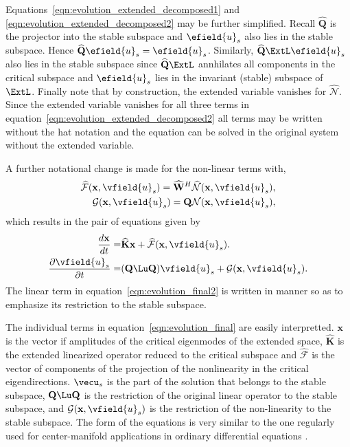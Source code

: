 Equations~\eqref{eqn:evolution_extended_decomposed1} and \eqref{eqn:evolution_extended_decomposed2} may be further simplified. Recall $\mathbf{\widehat{Q}}$ is the projector into the stable subspace and $\efield{u}_{s}$ also lies in the stable subspace. Hence $\mathbf{\widehat{Q}}\efield{u}_{s} = \efield{u}_{s}$. Similarly, $\mathbf{\widehat{Q}}\ExtL\efield{u}_{s}$ also lies in the stable subspace since $\mathbf{\widehat{Q}}\ExtL$ annhilates all components in the critical subspace and $\efield{u}_{s}$ lies in the invariant (stable) subspace of $\ExtL$. Finally note that by construction, the extended variable vanishes for $\mathcal{\widehat{N}}$. Since the extended variable vanishes for all three terms in equation~\eqref{eqn:evolution_extended_decomposed2} all terms may be written without the hat notation and the equation can be solved in the original system without the extended variable. 

A further notational change is made for the non-linear terms with,
\begin{eqnarray}
	\mathcal{\widehat{F}}(\mathbf{x},\vfield{u}_{s}) = \mathbf{\widehat{W}}^{H}\mathcal{\widehat{N}}(\mathbf{x},\vfield{u}_{s}), \nonumber \\
	\mathcal{G}(\mathbf{x},\vfield{u}_{s}) = \mathbf{Q}\mathcal{N}(\mathbf{x},\vfield{u}_{s}), \nonumber
\end{eqnarray} 
which results in the pair of equations given by
\begin{subequations}
	\begin{align}
		\dfrac{d\mathbf{x}}{d t} =& \mathbf{\widehat{K}}\mathbf{x} + \mathcal{\widehat{F}}(\mathbf{x},\vfield{u}_{s}) \label{eqn:evolution_final1}.\\
		\dfrac{\partial \vfield{u}_{s}}{\partial t} =& (\mathbf{Q}\Lu \mathbf{Q})\vfield{u}_{s} + \mathcal{G}(\mathbf{x},\vfield{u}_{s})
		\label{eqn:evolution_final2}. 
	\end{align}
	\label{eqn:evolution_final}
\end{subequations}
 The linear term in equation~\eqref{eqn:evolution_final2} is written in manner so as to emphasize its restriction to the stable subspace. 
 
 The individual terms in equation~\eqref{eqn:evolution_final} are easily interpretted. $\mathbf{x}$ is the vector if amplitudes of the critical eigenmodes of the extended space, $\mathbf{\widehat{K}}$ is the extended linearized operator reduced to the critical subspace and $\mathcal{\widehat{F}}$ is the vector of components of the projection of the nonlinearity in the critical eigendirections. $\vecu_{s}$ is the part of the solution that belongs to the stable subspace, $\mathbf{Q}\Lu\mathbf{Q}$ is the restriction of the original linear operator to the stable subspace, and $\mathcal{G}(\mathbf{x},\vfield{u}_{s})$ is the restriction of the non-linearity to the stable subspace. The form of the equations is very similar to the one regularly used for center-manifold applications in ordinary differential equations \citep{guckenheimer83,wiggins03}. 
 
